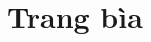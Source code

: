\documentclass{article}
\begin{document}
\section{Trang bìa}


\thispagestyle{empty}

\end{document}
